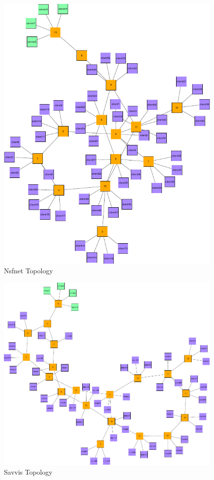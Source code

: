 \begin{figure}[htbp]
    \centering
    \includegraphics[width=\linewidth]{Networks/Nsfnet_final.pdf}
    \caption{Nsfnet Topology}
    \label{fig:Nsfnet}
\end{figure}

\begin{figure}[htbp]
    \centering
    \includegraphics[width=\linewidth]{Networks/Savvis_final.pdf}
    \caption{Savvis Topology}
    \label{fig:Saavis}
\end{figure}

